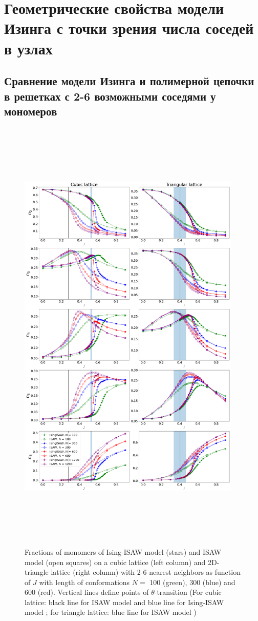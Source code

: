 \section{Геометрические свойства модели Изинга с точки зрения числа соседей в узлах}

\subsection{Сравнение модели Изинга и полимерной цепочки в решетках с 2-6 возможными соседями у мономеров}

\begin{figure}
    \centering
    \includegraphics[width=0.95\textwidth, height=21.5cm]{Sections/Images/Ising_vs_ISAW.png}
    \caption{Fractions of monomers of Ising-ISAW model (stars) and ISAW model (open squares) on a cubic lattice (left column) and 2D-triangle lattice (right column) with 2-6 nearest neighbors as function of $J$ with length of conformations $N = $ 100 (green), 300 (blue) and 600 (red). Vertical lines define points of $\theta$-transition (For cubic lattice: black line for ISAW model \cite{Tesi1996} and blue line for Ising-ISAW model \cite{Foster2021}; for triangle lattice: blue line for ISAW model \cite{Privman1986})}
    \label{fig:Ising_vs_ISAW}
\end{figure}


